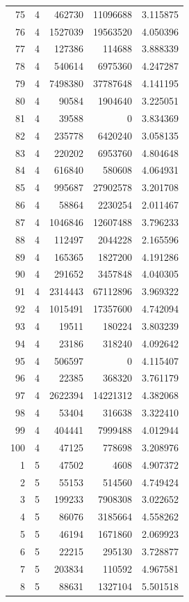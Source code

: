 \begin{longtable}{rrrrr}
75 & 4 & 462730 & 11096688 & 3.115875\\
76 & 4 & 1527039 & 19563520 & 4.050396\\
77 & 4 & 127386 & 114688 & 3.888339\\
78 & 4 & 540614 & 6975360 & 4.247287\\
79 & 4 & 7498380 & 37787648 & 4.141195\\
80 & 4 & 90584 & 1904640 & 3.225051\\
81 & 4 & 39588 & 0 & 3.834369\\
82 & 4 & 235778 & 6420240 & 3.058135\\
83 & 4 & 220202 & 6953760 & 4.804648\\
84 & 4 & 616840 & 580608 & 4.064931\\
85 & 4 & 995687 & 27902578 & 3.201708\\
86 & 4 & 58864 & 2230254 & 2.011467\\
87 & 4 & 1046846 & 12607488 & 3.796233\\
88 & 4 & 112497 & 2044228 & 2.165596\\
89 & 4 & 165365 & 1827200 & 4.191286\\
90 & 4 & 291652 & 3457848 & 4.040305\\
91 & 4 & 2314443 & 67112896 & 3.969322\\
92 & 4 & 1015491 & 17357600 & 4.742094\\
93 & 4 & 19511 & 180224 & 3.803239\\
94 & 4 & 23186 & 318240 & 4.092642\\
95 & 4 & 506597 & 0 & 4.115407\\
96 & 4 & 22385 & 368320 & 3.761179\\
97 & 4 & 2622394 & 14221312 & 4.382068\\
98 & 4 & 53404 & 316638 & 3.322410\\
99 & 4 & 404441 & 7999488 & 4.012944\\
100 & 4 & 47125 & 778698 & 3.208976\\
1 & 5 & 47502 & 4608 & 4.907372\\
2 & 5 & 55153 & 514560 & 4.749424\\
3 & 5 & 199233 & 7908308 & 3.022652\\
4 & 5 & 86076 & 3185664 & 4.558262\\
5 & 5 & 46194 & 1671860 & 2.069923\\
6 & 5 & 22215 & 295130 & 3.728877\\
7 & 5 & 203834 & 110592 & 4.967581\\
8 & 5 & 88631 & 1327104 & 5.501518\\

\end{longtable}
